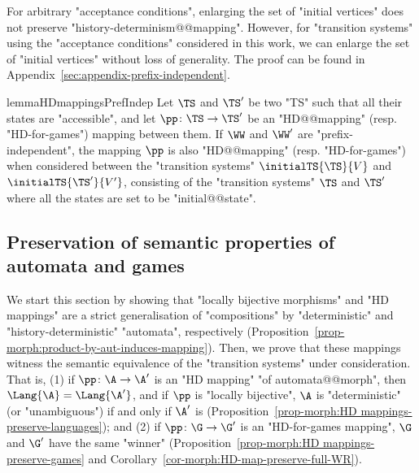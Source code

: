 \documentclass{theoretics}
\begin{document}
For arbitrary "acceptance conditions", enlarging the set of "initial vertices" does not preserve "history-determinism@@mapping". However, for "transition systems" using the "acceptance conditions" considered in this work, we can enlarge the set of "initial vertices" without loss of generality. The proof can be found in Appendix~\ref{sec:appendix-prefix-independent}.


\begin{restatable}{lemma}{HDmappingsPrefIndep}\label{lemma-morph:HD mappings-with-prefix-independent-conditions}
	Let $\TS$ and $\TS'$ be two "TS" such that all their states are "accessible", and let $\pp\colon \TS \to \TS'$ be an "HD@@mapping" (resp. "HD-for-games") mapping between them. If $\WW$ and $\WW'$ are "prefix-independent", the mapping $\pp$ is also "HD@@mapping" (resp. "HD-for-games") when considered between the "transition systems" $\initialTS{\TS}{V}$ and $\initialTS{\TS'}{V'}$, consisting of the "transition systems" $\TS$ and $\TS'$ where all the states are set to be "initial@@state".
\end{restatable}


\subsection{Preservation of semantic properties of automata and games}\label{subsec-morph:semantic-properties}

We start this section by showing that "locally bijective morphisms" and "HD mappings" are a strict generalisation of "compositions" by "deterministic" and "history-deterministic" "automata", respectively (Proposition~\ref{prop-morph:product-by-aut-induces-mapping}). 
Then, we prove that these mappings witness the semantic equivalence of the "transition systems" under consideration. That is, (1) if $\pp\colon \A\to \A'$ is an "HD mapping" "of automata@@morph", then $\Lang{\A} = \Lang{\A'}$, and if $\pp$ is "locally bijective", $\A$ is "deterministic" (or "unambiguous") if and only if $\A'$ is (Proposition~\ref{prop-morph:HD mappings-preserve-languages});\footnotemark{} and (2) if $\pp\colon \G\to \G'$ is an "HD-for-games mapping", $\G$ and $\G'$ have the same "winner" (Proposition~\ref{prop-morph:HD mappings-preserve-games} and Corollary~\ref{cor-morph:HD-map-preserve-full-WR}).

\end{document}
